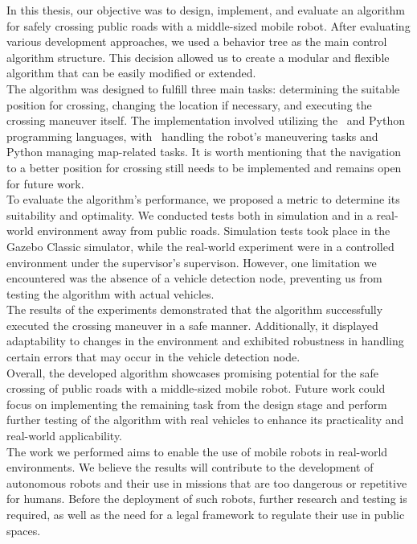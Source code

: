 In this thesis, our objective was to design, implement, and evaluate an algorithm for safely crossing public roads with a middle-sized mobile robot. After evaluating various development approaches, we used a behavior tree as the main control algorithm structure. This decision allowed us to create a modular and flexible algorithm that can be easily modified or extended.\\
The algorithm was designed to fulfill three main tasks: determining the suitable position for crossing, changing the location if necessary, and executing the crossing maneuver itself. The implementation involved utilizing the \CC\ and Python programming languages, with \CC\ handling the robot's maneuvering tasks and Python managing map-related tasks. It is worth mentioning that the navigation to a better position for crossing still needs to be implemented and remains open for future work.\\
To evaluate the algorithm's performance, we proposed a metric to determine its suitability and optimality. We conducted tests both in simulation and in a real-world environment away from public roads. Simulation tests took place in the Gazebo Classic simulator, while the real-world experiment were in a controlled environment under the supervisor's supervison. However, one limitation we encountered was the absence of a vehicle detection node, preventing us from testing the algorithm with actual vehicles.\\
The results of the experiments demonstrated that the algorithm successfully executed the crossing maneuver in a safe manner. Additionally, it displayed adaptability to changes in the environment and exhibited robustness in handling certain errors that may occur in the vehicle detection node.\\
Overall, the developed algorithm showcases promising potential for the safe crossing of public roads with a middle-sized mobile robot. Future work could focus on implementing the remaining task from the design stage and perform further testing of the algorithm with real vehicles to enhance its practicality and real-world applicability.\\
The work we performed aims to enable the use of mobile robots in real-world environments. We believe the results will contribute to the development of autonomous robots and their use in missions that are too dangerous or repetitive for humans. Before the deployment of such robots, further research and testing is required, as well as the need for a legal framework to regulate their use in public spaces.
